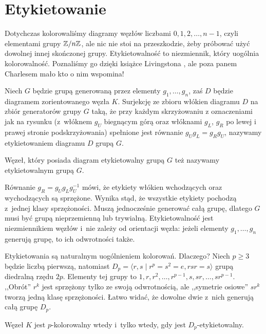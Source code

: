 
\section{Etykietowanie}

Dotychczas kolorowaliśmy diagramy węzłów liczbami $0, 1, 2, \ldots, n-1$, czyli elementami grupy $\mathbb Z/n\mathbb Z$, ale nic nie stoi na przeszkodzie, żeby próbować użyć dowolnej innej skończonej grupy.
Etykietowalność to niezmiennik, który uogólnia kolorowalność.
Poznaliśmy go dzięki książce Livingstona \cite[s. 89-99]{livingston1993}, ale poza panem Charlesem mało kto o nim wspomina!

\begin{definition}[etykietowanie]
    Niech $G$ będzie grupą generowaną przez elementy $g_1, \ldots, g_n$, zaś  $D$ będzie diagramem zorientowanego węzła $K$.
    Surjekcję ze zbioru włókien diagramu $D$ na zbiór generatorów grupy $G$ taką, że przy każdym skrzyżowaniu z oznaczeniami jak na rysunku (z~włóknem $g_U$ biegnącym górą oraz włóknami $g_L$, $g_R$ po lewej i prawej stronie podskrzyżowania) spełnione jest równanie $g_Ug_L = g_Rg_U$, nazywamy etykietowaniem diagramu $D$ grupą $G$.
\begin{comment}
        \[
            \LargePlusCrossingLabel
        \]
\end{comment}
    Węzeł, który posiada diagram etykietowalny grupą $G$ też nazywamy etykietowalnym grupą $G$.
\end{definition}

Równanie $g_R = g_Ug_Lg_U^{-1}$ mówi, że etykiety włókien wchodzących oraz wychodzących są sprzężone.
Wynika stąd, że wszystkie etykiety pochodzą z~jednej klasy sprzężoności.
Muszą jednocześnie generować całą grupę, dlatego $G$ musi być grupą nieprzemienną lub trywialną.
Etykietowalność jest niezmiennikiem węzłów i~nie zależy od orientacji węzła: jeżeli elementy $g_1, \ldots, g_n$ generują grupę, to ich odwrotności także.

Etykietowania są naturalnym uogólnieniem kolorowań.
Dlaczego?
Niech $p \ge 3$ będzie liczbą pierwszą, natomiast $D_p = \langle r, s \mid r^p = s^2 = e, rsr = s \rangle$ grupą diedralną rzędu $2p$.
Elementy tej grupy to $1, r, r^2, \ldots, r^{p-1}, s, sr, \ldots, sr^{p-1}$.
,,Obrót'' $r^k$ jest sprzężony tylko ze swoją odwrotnością, ale ,,symetrie osiowe'' $sr^k$ tworzą jedną klasę sprzężoności.
Łatwo widać, że dowolne dwie z~nich generują całą grupę $D_p$.

\begin{proposition}
    Węzeł $K$ jest $p$-kolorowalny wtedy i~tylko wtedy, gdy jest $D_p$-etykietowalny.
\end{proposition}


